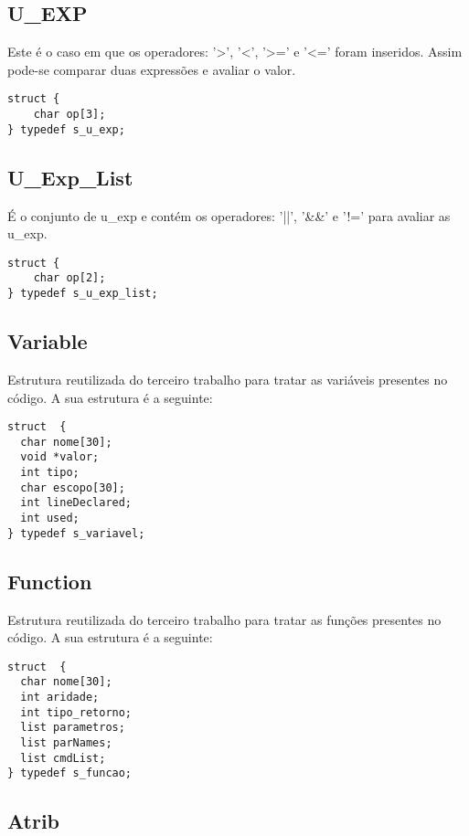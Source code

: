 \documentclass[a4paper,10pt]{article}
\begin{document}
\subsection{U\_EXP}

Este é o caso em que os operadores: '>', '<', '>=' e '<=' foram inseridos. Assim pode-se comparar duas expressões e avaliar o valor.

\begin{lstlisting}
struct {
	char op[3];
} typedef s_u_exp;
\end{lstlisting}

\subsection{U\_Exp\_List}

É o conjunto de u\_exp e contém os operadores: '||', '\&\&' e '!=' para avaliar as u\_exp.

\begin{lstlisting}
struct {
	char op[2];
} typedef s_u_exp_list;
\end{lstlisting}

\subsection{Variable}

Estrutura reutilizada do terceiro trabalho para tratar as variáveis presentes no código. A sua estrutura é a seguinte:

\begin{lstlisting}
struct  {
  char nome[30];
  void *valor;
  int tipo;
  char escopo[30];
  int lineDeclared;
  int used;
} typedef s_variavel;
\end{lstlisting}

\subsection{Function}

Estrutura reutilizada do terceiro trabalho para tratar as funções presentes no código. A sua estrutura é a seguinte:

\begin{lstlisting}
struct  {
  char nome[30];
  int aridade;
  int tipo_retorno;
  list parametros;
  list parNames;
  list cmdList;
} typedef s_funcao;
\end{lstlisting}
\subsection{Atrib}
\end{document}
